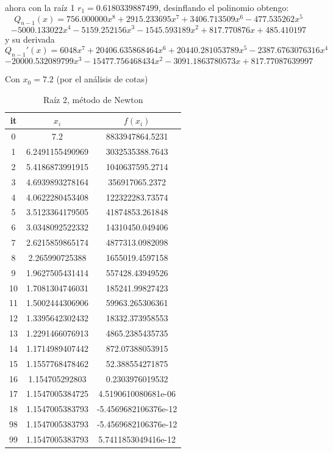 \documentclass{article} %
\begin{document}
ahora con la raíz 1 $r_1 = 0.6180339887499$, desinflando el polinomio obtengo:
\begin{equation*}
Q_{n-1}(x) = 756.000000x^8 + 2915.233695x^7 + 3406.713509x^6-477.535262x^5
\end{equation*}
\begin{equation*}
-5000.133022x^4 -5159.252156x^3 -1545.593189x^2 + 817.770876x + 485.410197
\end{equation*}
y su derivada
\begin{equation*}
Q_{n-1}'(x) = 6048x^7 + 20406.635868464x^6 + 20440.281053789x^5 -2387.6763076316x^4
\end{equation*}
\begin{equation*}
-20000.532089799x^3 -15477.756468434x^2 -3091.1863780573x + 817.77087639997
\end{equation*}

Con $x_0 = 7.2$ (por el análisis de cotas) 
\begin{table}[H]
\centering
\begin{tabular}{|c|c|c|}
\hline
it & $x_i$ & $f(x_i)$\\
\hline
0 & 7.2 & 8833947864.5231\\
\hline
1 & 6.2491155490969 & 3032535388.7643\\
2 & 5.4186873991915 & 1040637595.2714\\
3 & 4.6939893278164 & 356917065.2372\\
4 & 4.0622280453408 & 122322283.73574\\
5 & 3.5123364179505 & 41874853.261848\\
6 & 3.0348092522332 & 14310450.049406\\
7 & 2.6215859865174 & 4877313.0982098\\
8 & 2.265990725388 & 1655019.4597158\\
9 & 1.9627505431414 & 557428.43949526\\
10 & 1.7081304746031 & 185241.99827423\\
11 & 1.5002444306906 & 59963.265306361\\
12 & 1.3395642302432 & 18332.373958553\\
13 & 1.2291466076913 & 4865.2385435735\\
14 & 1.1714989407442 & 872.07388053915\\
15 & 1.1557768478462 & 52.388554271875\\
16 & 1.154705292803 & 0.2303976019532\\
17 & 1.1547005384725 & 4.5190610080681e-06\\
18 & 1.1547005383793 & -5.4569682106376e-12\\
98 & 1.1547005383793 & -5.4569682106376e-12\\
99 & 1.1547005383793 & 5.7411853049416e-12\\
\hline
\end{tabular}
\caption{Raíz 2, método de Newton}
\end{table}
\end{document}
